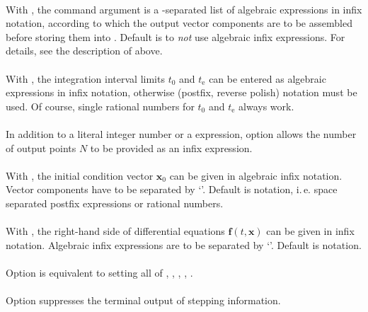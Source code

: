\documentclass[
  fontsize=11pt,
  english,
  BCOR=10mm,DIV=12,
  bibliography=totoc,
  parskip=false,
  headings=small,
  headinclude=false,
  footinclude=false,
  twoside=false,
  UKenglish
]{pst-doc}
\begin{document}
\noindent{}\\
With , the command argument  is a \Lkeyword{|}-separated list of algebraic expressions in infix notation, according to which the output vector components are to be assembled before storing them into . Default is to  \emph{not} use algebraic infix expressions. For details, see the description of  above.\\

\noindent{}\\
With , the integration interval limits $t_0$ and $t_\mathrm{e}$ can be entered as algebraic expressions in infix notation, otherwise \PS{} (postfix, reverse polish) notation must be used. Of course, single rational numbers for  $t_0$ and $t_\mathrm{e}$ always work.\\

\noindent{}\\
In addition to a literal integer number or a \PS{} expression, option  allows the number of output points $N$ to be provided as an infix expression.\\

\noindent{}\\
With , the initial condition vector $\mathbf{x}_0$ can be given in algebraic infix notation. Vector components have to be separated by `\Lkeyword{|}'. Default is \PS{} notation, i.\,e. space separated postfix expressions or rational numbers.\\

\noindent{}\\
With , the right-hand side of differential equations $\mathbf{f}(t,\mathbf{x})$ can be given in infix notation. Algebraic infix expressions are to be separated by `\Lkeyword{|}'. Default is \PS{} notation.\\

\noindent{}\\
Option  is equivalent to setting all of , , , , .\\

\noindent{}\\
Option  suppresses the terminal output of stepping information.\\
\end{document}
